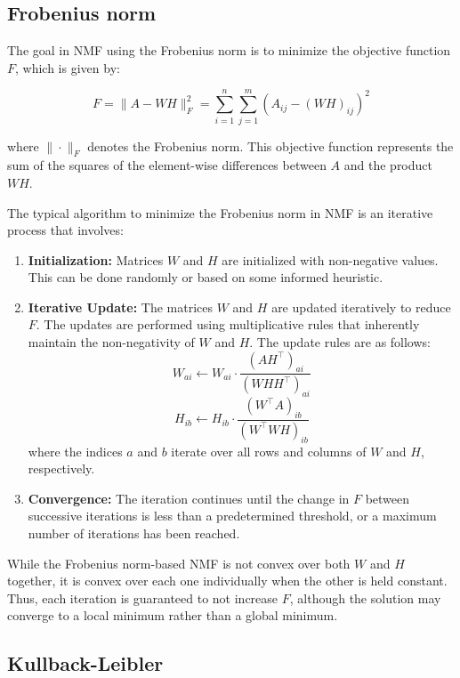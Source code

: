 \subsection{Frobenius norm}

The goal in NMF using the Frobenius norm is to minimize the objective function \( F \), which is given by:

\[
    F = \| A - WH \|_F^2 = \sum_{i=1}^{n} \sum_{j=1}^{m} (A_{ij} - (WH)_{ij})^2
\]

where \( \| \cdot \|_F \) denotes the Frobenius norm. This objective function represents the sum of the squares of the element-wise differences between \( A \) and the product \( WH \).

The typical algorithm to minimize the Frobenius norm in NMF is an iterative process that involves:

\begin{enumerate}
    \item \textbf{Initialization:} Matrices \( W \) and \( H \) are initialized with non-negative values. This can be done randomly or based on some informed heuristic.
    \item \textbf{Iterative Update:} The matrices \( W \) and \( H \) are updated iteratively to reduce \( F \). The updates are performed using multiplicative rules that inherently maintain the non-negativity of \( W \) and \( H \). The update rules are as follows:
          \[
              W_{ai} \leftarrow W_{ai} \cdot \frac{(AH^\top)_{ai}}{(WHH^\top)_{ai}}
          \]
          \[
              H_{ib} \leftarrow H_{ib} \cdot \frac{(W^\top A)_{ib}}{(W^\top WH)_{ib}}
          \]
          where the indices \( a \) and \( b \) iterate over all rows and columns of \( W \) and \( H \), respectively.
    \item \textbf{Convergence:} The iteration continues until the change in \( F \) between successive iterations is less than a predetermined threshold, or a maximum number of iterations has been reached.
\end{enumerate}

While the Frobenius norm-based NMF is not convex over both \( W \) and \( H \) together, it is convex over each one individually when the other is held constant. Thus, each iteration is guaranteed to not increase \( F \), although the solution may converge to a local minimum rather than a global minimum.

\subsection{Kullback-Leibler}

